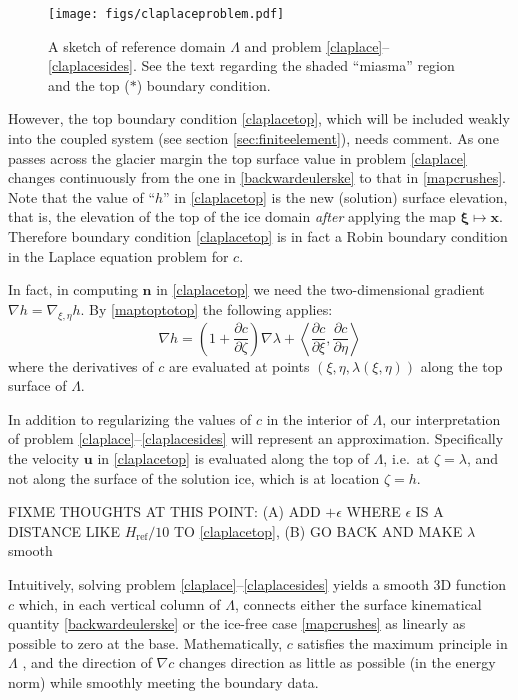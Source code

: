 \documentclass[letterpaper,final,12pt,reqno]{amsart}
\newcommand{\grad}{\nabla}
\newcommand{\bn}{\mathbf{n}}
\newcommand{\bu}{\mathbf{u}}
\newcommand{\bx}{\mathbf{x}}
\newcommand{\bxi}{\bm{\xi}}
\newcommand{\Href}{H_{\text{ref}}}
\begin{document}
\begin{figure}[ht]
\begin{center}
\texttt{[image: figs/claplaceproblem.pdf]}
\end{center}
\caption{A sketch of reference domain $\Lambda$ and problem \eqref{claplace}--\eqref{claplacesides}.  See the text regarding the shaded ``miasma'' region and the top ($\ast$) boundary condition.}
\label{fig:claplaceproblem}
\end{figure}

However, the top boundary condition \eqref{claplacetop}, which will be included weakly into the coupled system (see section \ref{sec:finiteelement}), needs comment.  As one passes across the glacier margin the top surface value in problem \eqref{claplace} changes continuously from the one in \eqref{backwardeulerske} to that in \eqref{mapcrushes}.  Note that the value of ``$h$'' in \eqref{claplacetop} is the new (solution) surface elevation, that is, the elevation of the top of the ice domain \emph{after} applying the map $\bxi\mapsto \bx$.  Therefore boundary condition \eqref{claplacetop} is in fact a Robin boundary condition in the Laplace equation problem for $c$.

In fact, in computing $\bn$ in \eqref{claplacetop} we need the two-dimensional gradient $\grad h=\grad_{\xi,\eta} h$.  By \eqref{maptoptotop} the following applies: 
\begin{equation}
\grad h = \left(1+\frac{\partial c}{\partial\zeta}\right) \grad \lambda + \left<\frac{\partial c}{\partial\xi},\frac{\partial c}{\partial\eta}\right> \label{hgradient}
\end{equation}
where the derivatives of $c$ are evaluated at points $(\xi,\eta,\lambda(\xi,\eta))$ along the top surface of $\Lambda$.

In addition to regularizing the values of $c$ in the interior of $\Lambda$, our interpretation of problem \eqref{claplace}--\eqref{claplacesides} will represent an approximation.  Specifically the velocity $\bu$ in \eqref{claplacetop} is evaluated along the top of $\Lambda$, i.e.~at $\zeta=\lambda$, and not along the surface of the solution ice, which is at location $\zeta=h$.

FIXME THOUGHTS AT THIS POINT: (A) ADD $+\epsilon$ WHERE $\epsilon$ IS A DISTANCE LIKE $\Href/10$ TO \eqref{claplacetop}, (B) GO BACK AND MAKE $\lambda$ smooth

Intuitively, solving problem \eqref{claplace}--\eqref{claplacesides} yields a smooth 3D function $c$ which, in each vertical column of $\Lambda$, connects either the surface kinematical quantity \eqref{backwardeulerske} or the ice-free case \eqref{mapcrushes} as linearly as possible to zero at the base.  Mathematically, $c$ satisfies the maximum principle in $\Lambda$ \cite{Evans2010}, and the direction of $\grad c$ changes direction as little as possible (in the energy norm) while smoothly meeting the boundary data.
\end{document}
